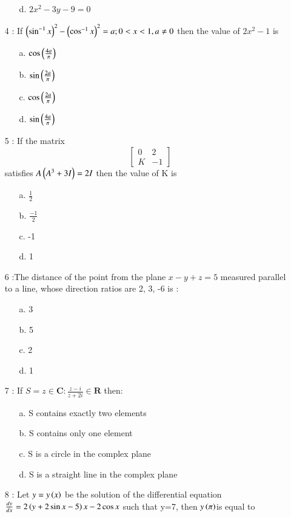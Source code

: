 \documentclass[journal]{IEEEtran}
\begin{document}
\begin{enumerate}
\begin{enumerate}
    \item [d.] $2x^2-3y-9=0$
\end{enumerate}
\item[4]: If $\left(\sin ^{-1} x\right)^2-\left(\cos ^{-1} x\right)^2=a; 0<x<1, a\neq 0$ then the value of $2x^2-1$ is
 \begin{enumerate}
    \item [a.] $\cos\left(\frac{4a}{\pi}\right)$
    \item [b.] $\sin\left(\frac{2a}{\pi}\right)$
    \item [c.] $\cos\left(\frac{2a}{\pi}\right)$
    \item [d.] $\sin\left(\frac{4a}{\pi}\right)$
\end{enumerate}
\item[5]: If the matrix $$\begin{bmatrix}
    0&2\\K&-1
\end{bmatrix}$$ satisfies $A\left(A^3+3I\right) = 2I$ then the value of K is
\begin{enumerate}
    \item [a.] $\frac{1}{2}$
    \item [b.] $\frac{-1}{2}$
    \item [c.] -1
    \item [d.] 1
\end{enumerate}
\item[6]:The distance of the point  from the plane $x - y + z = 5$ measured parallel to a line, whose
direction ratios are 2, 3, -6 is :
\begin{enumerate}
\item [a.] 3
    \item [b.] 5
    \item [c.] 2
    \item [d.] 1
\end{enumerate}
\item[7]: If $S = {z\in\mathbf{C}:\frac{z-i}{z+2i}\in \mathbf{R}}$ then:
\begin{enumerate}
 \item [a.]  S contains exactly two elements
    \item [b.]  S contains only one element
    \item [c.]  S is a circle in the complex plane
    \item [d.]  S is a straight line in the complex plane
\end{enumerate}
\item[8]: Let $y=y\left(x\right)$ be the solution of the differential equation $\frac{dy}{dx}=2\left(y+2\sin x-5\right)x-2\cos{x}$ such that y=7, then $y\left(\pi\right)$is equal to

\end{enumerate}
\end{document}
